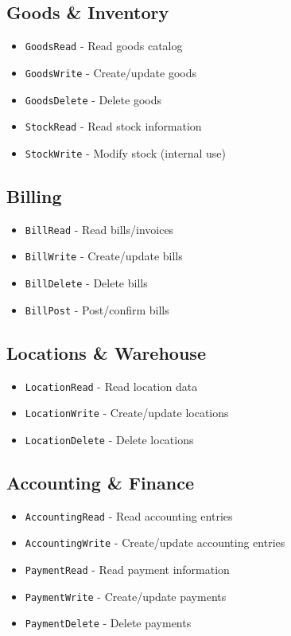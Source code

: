\subsection{Goods \& Inventory}\label{goods-inventory}

\begin{itemize}
\tightlist
\item
  \texttt{GoodsRead} - Read goods catalog
\item
  \texttt{GoodsWrite} - Create/update goods
\item
  \texttt{GoodsDelete} - Delete goods
\item
  \texttt{StockRead} - Read stock information
\item
  \texttt{StockWrite} - Modify stock (internal use)
\end{itemize}

\subsection{Billing}\label{billing}

\begin{itemize}
\tightlist
\item
  \texttt{BillRead} - Read bills/invoices
\item
  \texttt{BillWrite} - Create/update bills
\item
  \texttt{BillDelete} - Delete bills
\item
  \texttt{BillPost} - Post/confirm bills
\end{itemize}

\subsection{Locations \& Warehouse}\label{locations-warehouse}

\begin{itemize}
\tightlist
\item
  \texttt{LocationRead} - Read location data
\item
  \texttt{LocationWrite} - Create/update locations
\item
  \texttt{LocationDelete} - Delete locations
\end{itemize}

\subsection{Accounting \& Finance}\label{accounting-finance}

\begin{itemize}
\tightlist
\item
  \texttt{AccountingRead} - Read accounting entries
\item
  \texttt{AccountingWrite} - Create/update accounting entries
\item
  \texttt{PaymentRead} - Read payment information
\item
  \texttt{PaymentWrite} - Create/update payments
\item
  \texttt{PaymentDelete} - Delete payments
\end{itemize}

